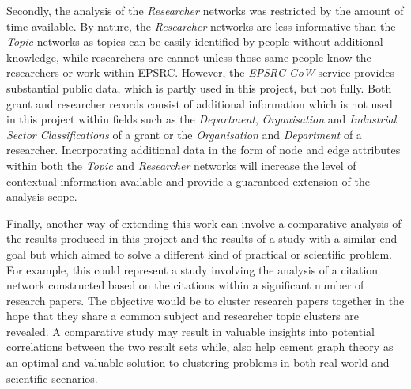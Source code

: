 Secondly, the analysis of the \textit{Researcher} networks was restricted by the amount of time available. By nature, the \textit{Researcher} networks are less informative than the \textit{Topic} networks as topics can be easily identified by people without additional knowledge, while researchers are cannot unless those same people know the researchers or work within EPSRC. However, the \textit{EPSRC GoW} service provides substantial public data, which is partly used in this project, but not fully. Both grant and researcher records consist of additional information which is not used in this project within fields such as the \textit{Department}, \textit{Organisation} and \textit{Industrial Sector Classifications} of a grant or the \textit{Organisation} and \textit{Department} of a researcher. Incorporating additional data in the form of node and edge attributes within both the \textit{Topic} and \textit{Researcher} networks will increase the level of contextual information available and provide a guaranteed extension of the analysis scope.

Finally, another way of extending this work can involve a comparative analysis of the results produced in this project and the results of a study with a similar end goal but which aimed to solve a different kind of practical or scientific problem. For example, this could represent a study involving the analysis of a citation network constructed based on the citations within a significant number of research papers. The objective would be to cluster research papers together in the hope that they share a common subject and researcher topic clusters are revealed. A comparative study may result in valuable insights into potential correlations between the two result sets while, also help cement graph theory as an optimal and valuable solution to clustering problems in both real-world and scientific scenarios.